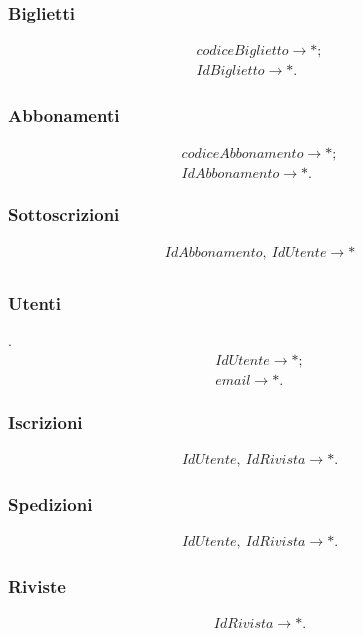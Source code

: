 \documentclass[10pt, italian, openany, landscape, fleqn]{book}
\begin{document}
\subsubsection*{Biglietti}
\begin{gather*}
codiceBiglietto \rightarrow *; \\
IdBiglietto \rightarrow *.
\end{gather*}
\subsubsection*{Abbonamenti}
\begin{gather*}
codiceAbbonamento \rightarrow *; \\
IdAbbonamento \rightarrow *.
\end{gather*}
\subsubsection*{Sottoscrizioni}
\begin{gather*}
IdAbbonamento, \ IdUtente \rightarrow * \\
\end{gather*}
\subsubsection*{Utenti}.
\begin{gather*}
IdUtente \rightarrow *; \\
email \rightarrow *.
\end{gather*}
\subsubsection*{Iscrizioni}
\begin{gather*}
IdUtente, \ IdRivista \rightarrow *.
\end{gather*}
\subsubsection*{Spedizioni}
\begin{gather*}
IdUtente, \ IdRivista \rightarrow *.
\end{gather*}
\subsubsection*{Riviste}
\begin{gather*}
IdRivista \rightarrow *.
\end{gather*}
\pagebreak
\end{document}
